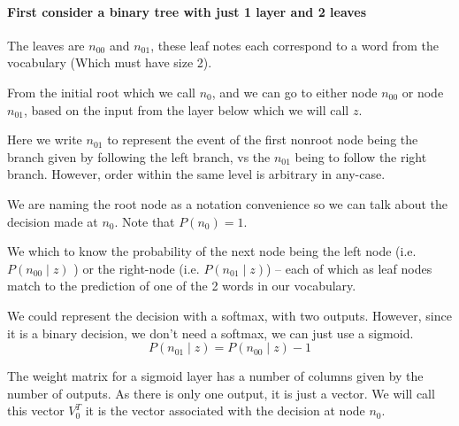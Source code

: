 \documentclass[parskip]{komatufte}
\begin{document}

\paragraph{First consider a binary tree with just 1 layer and 2 leaves}
The leaves are $n_{00}$ and $n_{01}$, these leaf notes each correspond to a word from the vocabulary (Which must have size 2).

	
From the initial root which we call $n_{0}$, and we can go to
either node $n_{00}$ or node $n_{01}$, based on the input from the
layer below which we will call $z$.

Here we write $n_{01}$ to represent the event of the first nonroot
node being the branch given by following the left branch, vs the $n_{01}$
being to follow the right branch.
However, order within the same level is arbitrary in any-case. 

We are naming the root node as a notation convenience so we can talk
about the decision made at $n_{0}$. 
Note that $P(n_{0})=1$.

We which to know the probability of the next node being the left node (i.e.
$P(n_{00}\mid z)$ ) or the right-node (i.e. $P(n_{01}\mid z)$) -- each of which as leaf nodes match to the prediction of one of the 2 words in our vocabulary.

We could represent the decision with a softmax, with two outputs.
However, since it is a binary decision, we don't need a softmax, we
can just use a sigmoid.
\begin{equation}
P(n_{01}\mid z)=P(n_{00}\mid z)-1
\end{equation}

The weight matrix for a sigmoid layer has a number of columns given
by the number of outputs.
As there is only one output, it is just a vector.
We will call this vector $V_{0}^{T}$ it is the vector associated with the decision at node $n_{0}$.

\end{document}
